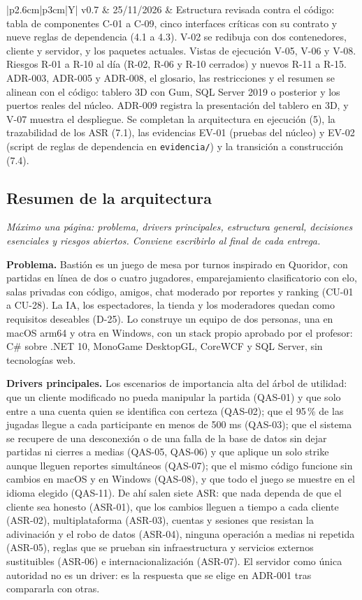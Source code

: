 \documentclass[11pt,letterpaper]{article}
\newcommand{\hint}[1]{{\itshape\color{black!70}#1}\par} %
\begin{document}
\begin{xltabular}{\linewidth}{|p{2.6cm}|p{3cm}|Y|}
  v0.7 & 25/11/2026 & Estructura revisada contra el código: tabla de componentes C-01 a C-09, cinco interfaces críticas con su contrato y nueve reglas de dependencia (4.1 a 4.3). V-02 se redibuja con dos contenedores, cliente y servidor, y los paquetes actuales. Vistas de ejecución V-05, V-06 y V-08. Riesgos R-01 a R-10 al día (R-02, R-06 y R-10 cerrados) y nuevos R-11 a R-15. ADR-003, ADR-005 y ADR-008, el glosario, las restricciones y el resumen se alinean con el código: tablero 3D con Gum, SQL Server 2019 o posterior y los puertos reales del núcleo. ADR-009 registra la presentación del tablero en 3D, y V-07 muestra el despliegue. Se completan la arquitectura en ejecución (5), la trazabilidad de los ASR (7.1), las evidencias EV-01 (pruebas del núcleo) y EV-02 (script de reglas de dependencia en \texttt{evidencia/}) y la transición a construcción (7.4).\\\hline
\end{xltabular}

\subsection{Resumen de la arquitectura}
\hint{Máximo una página: problema, drivers principales, estructura general, decisiones esenciales y riesgos abiertos. Conviene escribirlo al final de cada entrega.}
\textbf{Problema.} Bastión es un juego de mesa por turnos inspirado en Quoridor, con partidas en línea de dos o cuatro jugadores, emparejamiento clasificatorio con elo, salas privadas con código, amigos, chat moderado por reportes y ranking (CU-01 a CU-28). La IA, los espectadores, la tienda y los moderadores quedan como requisitos deseables (D-25). Lo construye un equipo de dos personas, una en macOS arm64 y otra en Windows, con un stack propio aprobado por el profesor: C\# sobre .NET 10, MonoGame DesktopGL, CoreWCF y SQL Server, sin tecnologías web.

\textbf{Drivers principales.} Los escenarios de importancia alta del árbol de utilidad: que un cliente modificado no pueda manipular la partida (QAS-01) y que solo entre a una cuenta quien se identifica con certeza (QAS-02); que el 95\,\% de las jugadas llegue a cada participante en menos de 500 ms (QAS-03); que el sistema se recupere de una desconexión o de una falla de la base de datos sin dejar partidas ni cierres a medias (QAS-05, QAS-06) y que aplique un solo strike aunque lleguen reportes simultáneos (QAS-07); que el mismo código funcione sin cambios en macOS y en Windows (QAS-08), y que todo el juego se muestre en el idioma elegido (QAS-11). De ahí salen siete ASR: que nada dependa de que el cliente sea honesto (ASR-01), que los cambios lleguen a tiempo a cada cliente (ASR-02), multiplataforma (ASR-03), cuentas y sesiones que resistan la adivinación y el robo de datos (ASR-04), ninguna operación a medias ni repetida (ASR-05), reglas que se prueban sin infraestructura y servicios externos sustituibles (ASR-06) e internacionalización (ASR-07). El servidor como única autoridad no es un driver: es la respuesta que se elige en ADR-001 tras compararla con otras.
\end{document}
